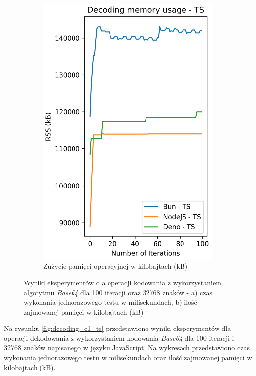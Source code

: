 \begin{figure}[H]
\begin{subfigure}[b]{0.42\textwidth}
    \includegraphics[width=\textwidth]{Figures/coding/base64_100_decoding_ts_memory.png}
    \caption{Zużycie pamięci operacyjnej w kilobajtach (kB)}
    \label{fig:encoding_e1_ts_memory}
  \end{subfigure}
  \hfill
  \caption{Wyniki eksperymentów dla operacji kodowania z wykorzystaniem algorytmu \textit{Base64} dla 100 iteracji oraz 32768 znaków - a) czas wykonania jednorazowego testu w milisekundach, b) ilość zajmowanej pamięci w kilobajtach (kB)}
  \label{fig:encoding_e1_ts}
\end{figure}

Na rysunku \ref{fig:decoding_e1_ts} przedstawiono wyniki eksperymentów dla operacji dekodowania z wykorzystaniem kodowania \textit{Base64} dla 100 iteracji i 32768 znaków napisanego w języku JavaScript. Na wykresach przedstawiono czas wykonania jednorazowego testu w milisekundach oraz ilość zajmowanej pamięci w kilobajtach (kB).

